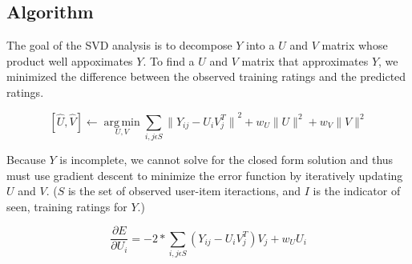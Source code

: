 \documentclass[12pt]{article}
\DeclareMathOperator*{\argmin}{arg\,min}
\begin{document}

\subsection*{Algorithm}
The goal of the SVD analysis is to decompose $Y$ into a $U$ and $V$ matrix whose product well appoximates $Y$. To find a $U$ and $V$ matrix that approximates $Y$, we minimized the difference between the observed training ratings and the predicted ratings.

$$ [\hat{U}, \hat{V}] \leftarrow \argmin\limits_{U,V}\sum\limits_{i,j \epsilon S} {\|Y_{ij} - U_i V_j^T\|}^2 + w_U\|U\|^2 + w_V\|V\|^2$$

Because $Y$ is incomplete, we cannot solve for the closed form solution and thus must use gradient descent to minimize the error function by iteratively updating $U$ and $V$. ($S$ is the set of observed user-item iteractions, and $I$ is the indicator of seen, training ratings for $Y$.)

$$ \frac{\partial E}{\partial U_i} = -2 * \sum\limits_{i,j \epsilon S} (Y_{ij} - U_i V_j^T) V_j + w_U U_i$$

\end{document}

